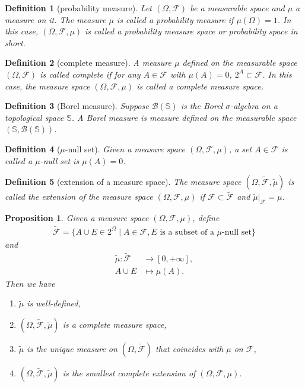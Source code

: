 \documentclass{report}
\newtheorem{definition}{Definition}[section]
\newtheorem{proposition}{Proposition}[section]
\theoremstyle{nonumberplain}
\begin{document}
\begin{definition}[probability measure]
	Let $(\Omega,{\mathcal {F}})$ be a measurable space and $\mu$ a measure on it. The measure $\mu$ is called a \emph{probability measure} if $\mu(\Omega)=1$. In this case, $(\Omega,{\mathcal {F}},\mu)$ is called a \emph{probability measure space} or \emph{probability space} in short.
\end{definition}

\begin{definition}[complete measure]
	A measure $\mu$ defined on the measurable space $(\Omega,\mathcal{F})$ is called \emph{complete} if for any $A \in \mathcal{F}$ with $\mu(A) = 0$, $2^A \subset \mathcal{F}$. In this case, the measure space $(\Omega,\mathcal{F},\mu)$ is called a complete measure space. 
\end{definition}

\begin{definition}[Borel measure]
	Suppose $\mathcal{B}(\mathbb{S})$ is the Borel $\sigma$-algebra on a topological space $\mathbb{S}$. A \emph{Borel measure} is measure defined on the measurable space $(\mathbb{S},\mathcal{B}(\mathbb{S}))$.
\end{definition}

\begin{definition}[$\mu$-null set]
	Given a measure space $(\Omega, \mathcal{F}, \mu)$, a set $A\in  \mathcal{F}$ is called a $\mu$-null set is $\mu(A)=0$.
\end{definition}

\begin{definition}[extension of a measure space]
	The measure space $(\Omega, \widetilde{\mathcal{F}}, \widetilde{\mu})$ is called the extension of the measure space $(\Omega, \mathcal{F}, \mu)$ if $\mathcal{F}\subset\widetilde{\mathcal{F}}$ and $\widetilde{\mu}|_{\mathcal{F}}=\mu$.
\end{definition}

\begin{proposition}
	Given a measure space $(\Omega, \mathcal{F}, \mu)$, define
	\begin{align*}
		\widetilde{\mathcal{F}}=\{A\cup E\in 2^\Omega\mid A\in\mathcal{F},E\text{ is a subset of a $\mu$-null set} \}
	\end{align*}
	and
	\begin{align*}
		\widetilde{\mu}:\widetilde{\mathcal{F}}&\longrightarrow[0,+\infty],\\
		A\cup E&\longmapsto \mu(A).
	\end{align*}
Then we have
\begin{enumerate}[(1)]
	\item $\widetilde{\mu}$ is well-defined,
	\item $(\Omega, \widetilde{\mathcal{F}}, \widetilde{\mu})$ is a complete measure space,
	\item $\widetilde{\mu}$ is the unique measure on $(\Omega, \widetilde{\mathcal{F}})$ that coincides with $\mu$ on $\mathcal{F}$,
	\item $(\Omega, \widetilde{\mathcal{F}}, \widetilde{\mu})$ is the smallest complete extension of $(\Omega, \mathcal{F}, \mu)$.
\end{enumerate}
\end{proposition}
\end{document}
